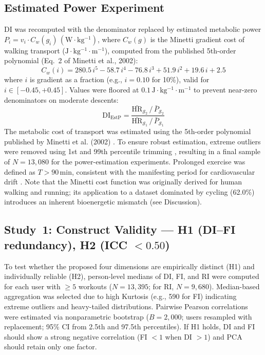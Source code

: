 \documentclass[times, twoside]{zHenriquesLab-StyleBioRxiv}
\begin{document}
\subsection*{Estimated Power Experiment}

DI was recomputed with the denominator replaced by estimated metabolic power $P_i = v_i \cdot C_w(g_i)\,\mathrm{(W{\cdot}kg^{-1})}$, where $C_w(g)$ is the Minetti \cite{minetti2002} gradient cost of walking transport ($\mathrm{J{\cdot}kg^{-1}{\cdot}m^{-1}}$), computed from the published 5th-order polynomial (Eq.~2 of Minetti et al., 2002):
\[
  C_w(i) = 280.5\,i^5 - 58.7\,i^4 - 76.8\,i^3 + 51.9\,i^2 + 19.6\,i + 2.5
\]
where $i$ is gradient as a fraction (e.g., $i = 0.10$ for 10\%), valid for $i \in [-0.45, +0.45]$. Values were floored at $0.1\,\mathrm{J{\cdot}kg^{-1}{\cdot}m^{-1}}$ to prevent near-zero denominators on moderate descents:
\[
  \text{DI}_{\text{EstP}} = \frac{\bar{\text{HR}}_{\mathcal{S}_2} \,/\, \bar{P}_{\mathcal{S}_2}}{\bar{\text{HR}}_{\mathcal{S}_1} \,/\, \bar{P}_{\mathcal{S}_1}}
\]
The metabolic cost of transport was estimated using the 5th-order polynomial published by Minetti et al. (2002) \cite{minetti2002}. To ensure robust estimation, extreme outliers were removed using 1st and 99th percentile trimming \cite{wilcox2012}, resulting in a final sample of $N = 13{,}080$ for the power-estimation experiments. Prolonged exercise was defined as $T > 90\,\mathrm{min}$, consistent with the manifesting period for cardiovascular drift \cite{coyle2001, acsm2018}. Note that the Minetti cost function was originally derived for human walking and running; its application to a dataset dominated by cycling (62.0\%) introduces an inherent bioenergetic mismatch (see Discussion).

\subsection*{Study~1: Construct Validity --- H1 (DI--FI redundancy), H2 (ICC $< 0.50$)}

To test whether the proposed four dimensions are empirically distinct (H1) and individually reliable (H2), person-level medians of DI, FI, and RI were computed for each user with $\geq 5$ workouts ($N = 13{,}395$; for RI, $N = 9{,}680$). Median-based aggregation was selected due to high Kurtosis (e.g., 590 for FI) indicating extreme outliers and heavy-tailed distributions. Pairwise Pearson correlations were estimated via nonparametric bootstrap ($B = 2{,}000$; users resampled with replacement; 95\% CI from 2.5th and 97.5th percentiles). 
If H1 holds, DI and FI should show a strong negative correlation (FI $< 1$ when DI $> 1$) and PCA should retain only one factor.
\end{document}
